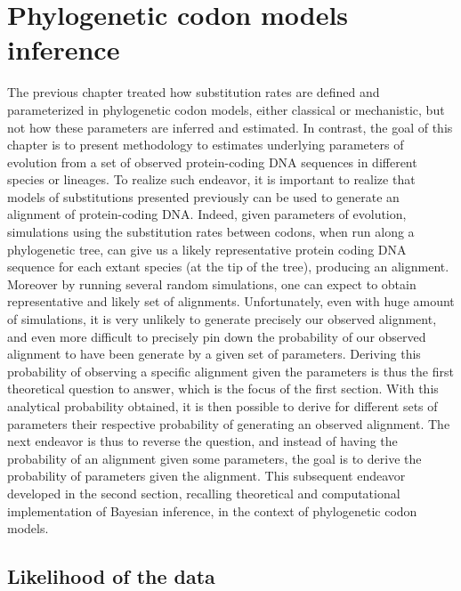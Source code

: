 \chapter{Phylogenetic {codon} models inference}
{\hypersetup{linkcolor=GREYDARK}\minitoc}
\label{chap:intro-inference}

The previous chapter treated how \gls{substitution} rates are defined and parameterized in phylogenetic codon models, either classical or mechanistic, but not how these parameters are inferred and estimated.
In contrast, the goal of this chapter is to present methodology to estimates underlying parameters of evolution from a set of observed protein-coding \acrshort{DNA} sequences in different species or lineages.
To realize such endeavor, it is important to realize that models of \glspl{substitution} presented previously can be used to generate an alignment of protein-coding \acrshort{DNA}.
Indeed, given parameters of evolution, simulations using the \gls{substitution} rates between \glspl{codon}, when run along a phylogenetic tree, can give us a likely representative protein coding \acrshort{DNA} sequence for each extant species (at the tip of the tree), producing an alignment.
Moreover by running several random simulations, one can expect to obtain representative and likely set of alignments.
Unfortunately, even with huge amount of simulations, it is very unlikely to generate precisely our observed alignment, and even more difficult to precisely pin down the probability of our observed alignment to have been generate by a given set of parameters.
Deriving this probability of observing a specific alignment given the parameters is thus the first theoretical question to answer, which is the focus of the first section.
With this analytical probability obtained, it is then possible to derive for different sets of parameters their respective probability of generating an observed alignment.
The next endeavor is thus to reverse the question, and instead of having the probability of an alignment given some parameters, the goal is to derive the probability of parameters given the alignment.
This subsequent endeavor developed in the second section, recalling theoretical and computational implementation of Bayesian inference, in the context of phylogenetic \gls{codon} models.


\section{Likelihood of the data}
\label{sec-intro:likelihood}

